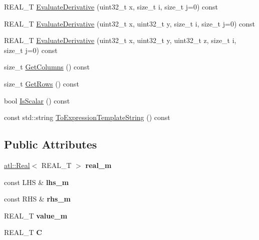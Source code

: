 \begin{DoxyCompactItemize}
R\+E\+A\+L\+\_\+\+T \hyperlink{structatl_1_1_min_a2536d60b2ba7fccbfabfb954926579d3}{Evaluate\+Derivative} (uint32\+\_\+t x, size\+\_\+t i, size\+\_\+t j=0) const 
\item 
R\+E\+A\+L\+\_\+\+T \hyperlink{structatl_1_1_min_aab273fac4e70e3dfd25cdead2a51e49e}{Evaluate\+Derivative} (uint32\+\_\+t x, uint32\+\_\+t y, size\+\_\+t i, size\+\_\+t j=0) const 
\item 
R\+E\+A\+L\+\_\+\+T \hyperlink{structatl_1_1_min_ad33789ca233fe222fa23ecf9d4c47abd}{Evaluate\+Derivative} (uint32\+\_\+t x, uint32\+\_\+t y, uint32\+\_\+t z, size\+\_\+t i, size\+\_\+t j=0) const 
\item 
size\+\_\+t \hyperlink{structatl_1_1_min_a92ca2d47c3be558142f22073576d388b}{Get\+Columns} () const 
\item 
size\+\_\+t \hyperlink{structatl_1_1_min_a613235ceb818cbcf3f0d1d44566489eb}{Get\+Rows} () const 
\item 
bool \hyperlink{structatl_1_1_min_a79249d6f8fe8f0e72a76c5500017ba7b}{Is\+Scalar} () const 
\item 
const std\+::string \hyperlink{structatl_1_1_min_ae111fb7b6653e06443e8a0cc1f352a18}{To\+Expression\+Template\+String} () const 
\end{DoxyCompactItemize}
\subsection*{Public Attributes}
\begin{DoxyCompactItemize}
\item 
\hypertarget{structatl_1_1_min_a17a188bdd4acfa552709b9a6ef2f3054}{\hyperlink{structatl_1_1_real}{atl\+::\+Real}$<$ R\+E\+A\+L\+\_\+\+T $>$ {\bfseries real\+\_\+m}}\label{structatl_1_1_min_a17a188bdd4acfa552709b9a6ef2f3054}

\item 
\hypertarget{structatl_1_1_min_a6be647bd755e2552c340508397502ef0}{const L\+H\+S \& {\bfseries lhs\+\_\+m}}\label{structatl_1_1_min_a6be647bd755e2552c340508397502ef0}

\item 
\hypertarget{structatl_1_1_min_a1846550a7199fb5e71e01d7a8a2098ef}{const R\+H\+S \& {\bfseries rhs\+\_\+m}}\label{structatl_1_1_min_a1846550a7199fb5e71e01d7a8a2098ef}

\item 
\hypertarget{structatl_1_1_min_ad315ae7baf1e69e5657e16c5a89f2222}{R\+E\+A\+L\+\_\+\+T {\bfseries value\+\_\+m}}\label{structatl_1_1_min_ad315ae7baf1e69e5657e16c5a89f2222}

\item 
\hypertarget{structatl_1_1_min_a6ea602e9de7f7aff2080eccd16c8b2a2}{R\+E\+A\+L\+\_\+\+T {\bfseries C}}\label{structatl_1_1_min_a6ea602e9de7f7aff2080eccd16c8b2a2}

\end{DoxyCompactItemize}


